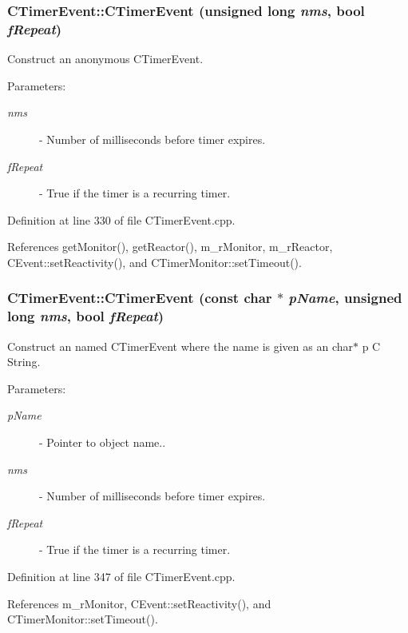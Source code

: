 \subsubsection{\setlength{\rightskip}{0pt plus 5cm}CTimer\-Event::CTimer\-Event (unsigned long {\em nms}, bool {\em f\-Repeat})}\label{classCTimerEvent_a0}


Construct an anonymous CTimer\-Event.  \begin{Desc}
\item[Parameters: ]\par
\begin{description}
\item[{\em 
nms}]- Number of milliseconds before timer expires. \item[{\em 
f\-Repeat}]- True if the timer is a recurring timer. \end{description}
\end{Desc}


Definition at line 330 of file CTimer\-Event.cpp.

References get\-Monitor(), get\-Reactor(), m\_\-r\-Monitor, m\_\-r\-Reactor, CEvent::set\-Reactivity(), and CTimer\-Monitor::set\-Timeout().
\subsubsection{\setlength{\rightskip}{0pt plus 5cm}CTimer\-Event::CTimer\-Event (const char $\ast$ {\em p\-Name}, unsigned long {\em nms}, bool {\em f\-Repeat})}\label{classCTimerEvent_a1}


Construct an named CTimer\-Event where the name is given as an char$\ast$ p C String. \begin{Desc}
\item[Parameters: ]\par
\begin{description}
\item[{\em 
p\-Name}]- Pointer to object name..  \item[{\em 
nms}]- Number of milliseconds before timer expires. \item[{\em 
f\-Repeat}]- True if the timer is a recurring timer. \end{description}
\end{Desc}


Definition at line 347 of file CTimer\-Event.cpp.

References m\_\-r\-Monitor, CEvent::set\-Reactivity(), and CTimer\-Monitor::set\-Timeout().
